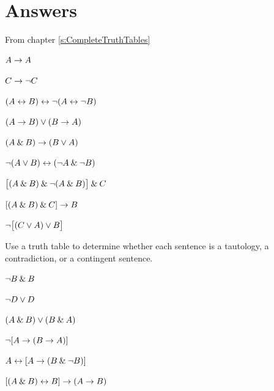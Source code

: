


\section{Answers}
\setcounter{ProbPart}{0}

\problempart
From chapter \ref{s:CompleteTruthTables}
\begin{earg}
\item $A \rightarrow A$ \hfill {}
\item $C \rightarrow{\neg} C$ \hfill {}
\item $(A \leftrightarrow B) \leftrightarrow {\neg}(A\leftrightarrow {\neg} B)$  \hfill {}
\item $(A \rightarrow B) \vee (B \rightarrow A)$  \hfill {}
\item $(A \mathbin{\&} B) \rightarrow (B \vee A)$  \hfill {}
\item ${\neg}(A \vee B) \leftrightarrow ({\neg} A \mathbin{\&} {\neg} B)$ \hfill {}
\item $\bigl[(A\mathbin{\&} B) \mathbin{\&}{\neg}(A\mathbin{\&} B)\bigr] \mathbin{\&} C$  \hfill {}
\item $[(A \mathbin{\&} B) \mathbin{\&} C] \rightarrow B$  \hfill {}
\item ${\neg}\bigl[(C\vee A) \vee B\bigr]$  \hfill {}
\end{earg}


\problempart Use a truth table to determine whether each sentence is a tautology, a contradiction, or a contingent sentence.
\begin{earg}
\item ${\neg} B \mathbin{\&} B$ \vspace{.5ex} \hfill {}
\item ${\neg} D \vee D$ \vspace{.5ex} \hfill {}
\item $(A\mathbin{\&} B) \vee (B\mathbin{\&} A)$\vspace{.5ex} \hfill {}
\item ${\neg}[A \rightarrow (B \rightarrow A)]$\vspace{.5ex} \hfill {}
\item $A \leftrightarrow [A \rightarrow (B \mathbin{\&} {\neg} B)]$ \vspace{.5ex} \hfill {}
\item $[(A \mathbin{\&} B) \leftrightarrow B] \rightarrow (A \rightarrow B)$ \vspace{.5ex} \hfill {}
\end{earg}


